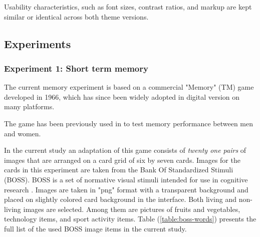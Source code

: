	Usability characteristics, such as font sizes, contrast ratios, and markup are kept similar or identical across both theme versions.
	


	

	
	\subsection{Experiments}

		\subsubsection{Experiment 1: Short term memory} \label{sec:memory}
		
		The current memory experiment is based on a commercial "Memory" (TM) game developed in 1966, which has since been widely adopted in digital version on many platforms. 
		
		The game has been previously used in \cite{McBurney1997} to test memory performance between men and women.
		
		In the current study an adaptation of this game consists of \textit{twenty one pairs} of images that are arranged on a card grid of six by seven cards. Images for the cards in this experiment are taken from the Bank Of Standardized Stimuli (BOSS). BOSS is a set of normative visual stimuli intended for use in cognitive research \cite{Brodeur2010}. Images are taken in "png" format with a transparent background and placed on slightly colored card background in the interface. Both living and non-living images are selected. Among them are pictures of fruits and vegetables, technology items, and sport activity items.
		Table (\ref{table:boss-words}) presents the full list of the used BOSS image items in the current study.
		
